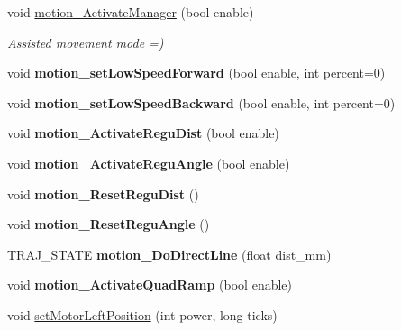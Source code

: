 \begin{DoxyCompactItemize}
void \hyperlink{classAsservEsialR_adf00fba115e602267a590236182094ac}{motion\+\_\+\+Activate\+Manager} (bool enable)
\begin{DoxyCompactList}\small\item\em Assisted movement mode =) \end{DoxyCompactList}\item 
\mbox{\label{classAsservEsialR_a2d5e1f02b80ab67a449ab10cff18c0db}} 
void {\bfseries motion\+\_\+set\+Low\+Speed\+Forward} (bool enable, int percent=0)
\item 
\mbox{\label{classAsservEsialR_a384c4439d8044cd32a04474daabc2cad}} 
void {\bfseries motion\+\_\+set\+Low\+Speed\+Backward} (bool enable, int percent=0)
\item 
\mbox{\label{classAsservEsialR_a810745ed547a8e4423a6462b1ae57541}} 
void {\bfseries motion\+\_\+\+Activate\+Regu\+Dist} (bool enable)
\item 
\mbox{\label{classAsservEsialR_a45955ed75acd253f4ba4a0af80b302a3}} 
void {\bfseries motion\+\_\+\+Activate\+Regu\+Angle} (bool enable)
\item 
\mbox{\label{classAsservEsialR_ad9fbdcb0e63ee5dad5d4cc3668173b56}} 
void {\bfseries motion\+\_\+\+Reset\+Regu\+Dist} ()
\item 
\mbox{\label{classAsservEsialR_a28d2d57f9040f90d94e4ab6254c22fc3}} 
void {\bfseries motion\+\_\+\+Reset\+Regu\+Angle} ()
\item 
\mbox{\label{classAsservEsialR_a08fc904da0513ea35c524958f8cc6df0}} 
T\+R\+A\+J\+\_\+\+S\+T\+A\+TE {\bfseries motion\+\_\+\+Do\+Direct\+Line} (float dist\+\_\+mm)
\item 
\mbox{\label{classAsservEsialR_a17eab63b10a4e1edf11013e6b18cafd2}} 
void {\bfseries motion\+\_\+\+Activate\+Quad\+Ramp} (bool enable)
\item 
\mbox{\label{classAsservEsialR_a93642e8abc2116fe8937d2c00f003977}} 
void \hyperlink{classAsservEsialR_a93642e8abc2116fe8937d2c00f003977}{set\+Motor\+Left\+Position} (int power, long ticks)

\end{DoxyCompactItemize}
